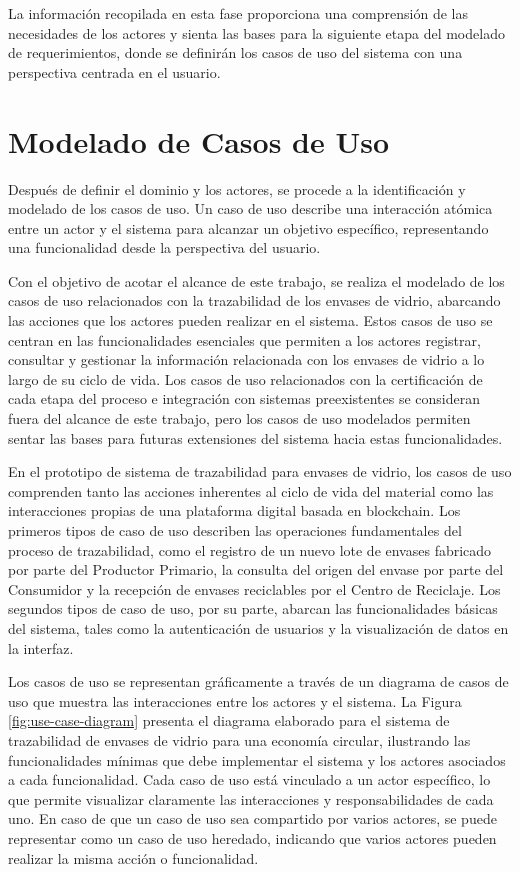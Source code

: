 
La información recopilada en esta fase proporciona una comprensión de las necesidades de los actores y sienta las bases para la siguiente etapa del modelado de requerimientos, donde se definirán los casos de uso del sistema con una perspectiva centrada en el usuario.

\section{Modelado de Casos de Uso}
\label{sec:use-cases}

Después de definir el dominio y los actores, se procede a la identificación y modelado de los casos de uso. Un caso de uso describe una interacción atómica entre un actor y el sistema para alcanzar un objetivo específico, representando una funcionalidad desde la perspectiva del usuario.

Con el objetivo de acotar el alcance de este trabajo, se realiza el modelado de los casos de uso relacionados con la trazabilidad de los envases de vidrio, abarcando las acciones que los actores pueden realizar en el sistema. Estos casos de uso se centran en las funcionalidades esenciales que permiten a los actores registrar, consultar y gestionar la información relacionada con los envases de vidrio a lo largo de su ciclo de vida. Los casos de uso relacionados con la certificación de cada etapa del proceso e integración con sistemas preexistentes se consideran fuera del alcance de este trabajo, pero los casos de uso modelados permiten sentar las bases para futuras extensiones del sistema hacia estas funcionalidades.

En el prototipo de sistema de trazabilidad para envases de vidrio, los casos de uso comprenden tanto las acciones inherentes al ciclo de vida del material como las interacciones propias de una plataforma digital basada en blockchain. Los primeros tipos de caso de uso describen las operaciones fundamentales del proceso de trazabilidad, como el registro de un nuevo lote de envases fabricado por parte del Productor Primario, la consulta del origen del envase por parte del Consumidor y la recepción de envases reciclables por el Centro de Reciclaje. Los segundos tipos de caso de uso, por su parte, abarcan las funcionalidades básicas del sistema, tales como la autenticación de usuarios y la visualización de datos en la interfaz.

Los casos de uso se representan gráficamente a través de un diagrama de casos de uso que muestra las interacciones entre los actores y el sistema. La Figura \ref{fig:use-case-diagram} presenta el diagrama elaborado para el sistema de trazabilidad de envases de vidrio para una economía circular, ilustrando las funcionalidades mínimas que debe implementar el sistema y los actores asociados a cada funcionalidad. Cada caso de uso está vinculado a un actor específico, lo que permite visualizar claramente las interacciones y responsabilidades de cada uno. En caso de que un caso de uso sea compartido por varios actores, se puede representar como un caso de uso heredado, indicando que varios actores pueden realizar la misma acción o funcionalidad.

